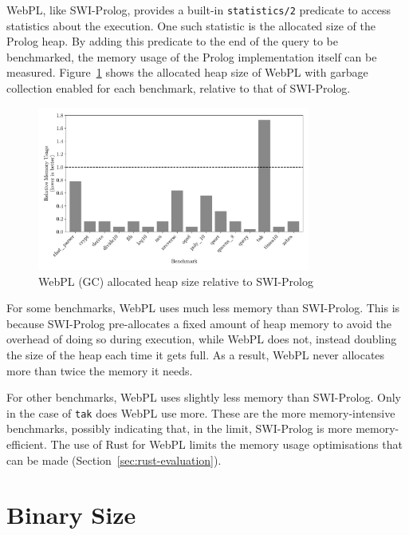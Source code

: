 \label{sec:prolog-heap-usage}

WebPL, like SWI-Prolog, provides a built-in \texttt{statistics/2} predicate to access statistics about the execution. One such statistic is the allocated size of the Prolog heap. By adding this predicate to the end of the query to be benchmarked, the memory usage of the Prolog implementation itself can be measured. Figure~\ref{fig:heap-usage} shows the allocated heap size of WebPL with garbage collection enabled for each benchmark, relative to that of SWI-Prolog.

\begin{figure}[t]
\centering
\includegraphics[width=0.8\textwidth]{relative_memory_builtin.pdf}
\caption{WebPL (GC) allocated heap size relative to SWI-Prolog}
\label{fig:heap-usage}
\end{figure}

For some benchmarks, WebPL uses much less memory than SWI-Prolog. This is because SWI-Prolog pre-allocates a fixed amount of heap memory to avoid the overhead of doing so during execution, while WebPL does not, instead doubling the size of the heap each time it gets full. As a result, WebPL never allocates more than twice the memory it needs.

For other benchmarks, WebPL uses slightly less memory than SWI-Prolog. Only in the case of \texttt{tak} does WebPL use more. These are the more memory-intensive benchmarks, possibly indicating that, in the limit, SWI-Prolog is more memory-efficient. The use of Rust for WebPL limits the memory usage optimisations that can be made (Section~\ref{sec:rust-evaluation}).

\section{Binary Size}

\label{sec:binary-size}

